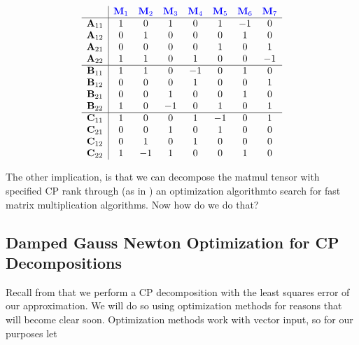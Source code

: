\begin{multicols}{2}
        \setlength{\arraycolsep}{3pt}
        \[\begin{array}{c|ccccccc}
            & \color{blue} \mathbf{M}_1 & \color{blue} \mathbf{M}_2 & \color{blue} \mathbf{M}_3 & \color{blue} \mathbf{M}_4 & \color{blue} \mathbf{M}_5 & \color{blue} \mathbf{M}_6 & \color{blue} \mathbf{M}_7 \\
            \hline
            \mathbf{A}_{11} & 1 & 0 & 1 & 0 & 1 & -1 & 0 \\
            \mathbf{A}_{12} & 0 & 1 & 0 & 0 & 0 & 1 & 0 \\
            \mathbf{A}_{21} & 0 & 0 & 0 & 0 & 1 & 0 & 1 \\
            \mathbf{A}_{22} & 1 & 1 & 0 & 1 & 0 & 0 & -1 \\
            \hline
            \mathbf{B}_{11} & 1 & 1 & 0 & -1 & 0 & 1 & 0 \\
            \mathbf{B}_{12} & 0 & 0 & 0 & 1 & 0 & 0 & 1 \\
            \mathbf{B}_{21} & 0 & 0 & 1 & 0 & 0 & 1 & 0 \\
            \mathbf{B}_{22} & 1 & 0 & -1 & 0 & 1 & 0 & 1 \\
            \hline
            \mathbf{C}_{11} & 1 & 0 & 0 & 1 & -1 & 0 & 1 \\
            \mathbf{C}_{21} & 0 & 0 & 1 & 0 & 1 & 0 & 0 \\
            \mathbf{C}_{12} & 0 & 1 & 0 & 1 & 0 & 0 & 0 \\
            \mathbf{C}_{22} & 1 & -1 & 1 & 0 & 0 & 1 & 0 \\
    \end{array}\]
    \end{multicols}
    
    
    The other implication, is that we can decompose the matmul tensor with
    specified CP rank through (as in ) an optimization
    algorithmto search for fast matrix multiplication algorithms. Now how do we
    do that?






\subsection{Damped Gauss Newton Optimization for CP Decompositions}\label{sec:Damped Gauss Newton Optimization for CP Decompositions}
    
    Recall from  that we perform a CP decomposition
    with the least squares error of our approximation. We will do so using
    optimization methods for reasons that will become clear soon. Optimization
    methods work with vector input, so for our purposes let 

